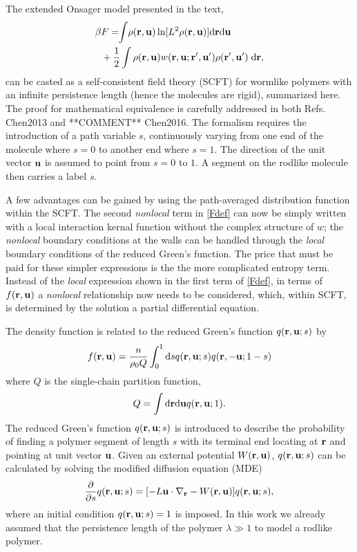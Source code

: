 \documentclass[pre,twocolumn,preprintnumbers,reprint]{revtex4}
\newcommand{\dd}{\mathrm{d}}
\newcommand{\intn}{\!\!\int\!}
\newcommand{\bu}{{\bf u}}
\newcommand{\br}{{\bf r}}
\newcommand{\rd}{{\rm d}}
\newcommand{\be}{\begin{equation}}
\newcommand{\en}{\end{equation}}
\newcommand*{\citen}{}%
\DeclareRobustCommand*{\citen}[1]{%
  \begingroup
    \romannumeral-`\x %
    \setcitestyle{numbers}%
    \cite{#1}%
  \endgroup
}
\begin{document}
The extended Onsager model presented in the text,
\begin{equation}
\begin{aligned}
\label{Fdef}
 \beta &F=\intn\rho(\mathbf{r},\mathbf{u}) \ln [L^2\rho(\mathbf{r},\mathbf{u}) ] {\rm d}\mathbf{r} {\rm d}\mathbf{u}\\
&+ \frac{1}{2}\int\rho(\mathbf{r},\mathbf{u}) w(\mathbf{r},\mathbf{u};\mathbf{r}^\prime, \mathbf{u}^\prime)\rho(\mathbf{r}^\prime, \mathbf{u}^\prime) \;\dd\mathbf{r} ,%
\end{aligned}
\end{equation}
can be casted as a self-consistent field theory (SCFT) for wormlike polymers with an infinite persistence length (hence the molecules are rigid), summarized here. The proof for mathematical equivalence is carefully addressed in both Refs. \citen{Chen2013} and **COMMENT** \citen{Chen2016}. The formalism requires the introduction of a path variable $s$, continuously varying from one end of the molecule where $s=0$ to another end where $s=1$. The direction of the unit vector $\bu$ is assumed to point from $s=0$ to $1$. A segment on the rodlike molecule then carries a label $s$.

A few advantages can be gained by using the path-averaged distribution function within the SCFT. The second {\emph{nonlocal}} term in \eqref{Fdef} can now be simply written
with a local interaction kernal function without the complex structure of $w$; the {\emph {nonlocal}} boundary conditions at the walls can be handled through the {\emph {local}} boundary conditions of the reduced Green's function. The price that must be paid for these simpler expressions is the the more complicated entropy term. Instead of the {\emph {local}} expression shown in the first term of \eqref{Fdef}, in terms of $f(\br, \bu)$ a {\emph{nonlocal}} relationship now needs to be considered, which, within SCFT, is determined by the solution a partial differential equation.

The density function is related to the reduced Green's function $q(\br,\bu;s)$ by
\be \label{q4}
f(\br,\bu)= \frac{n}{\rho_0 Q}\int_0^1\dd s q(\br,\bu;s)q(\br,-\bu;1-s)
\en
where $Q$ is the single-chain partition function,
\be \label{q2}
Q=\int\rd\br\rd\bu q(\br,\bu;1).
\en
The reduced Green's function $q(\br,\bu;s)$ is introduced to describe the probability of finding a polymer segment of length $s$ with its terminal end locating at $\br$ and pointing at unit vector $\bu$. Given an external potential $W(\br,\bu)$, $q(\br,\bu;s)$ can be calculated by solving the modified diffusion equation (MDE)\cite{Chen2013}
\be \label{q1}
\frac{\partial}{\partial s}q(\br,\bu;s)=[-L\bu\cdot\nabla_\br-W(\br,\bu)]q(\br,\bu;s),
\en
where an initial condition $q(\br,\bu;s)=1$ is imposed.
In this work we already assumed that the persistence length of the polymer $\lambda \gg 1$ to model a rodlike polymer.
\end{document}
